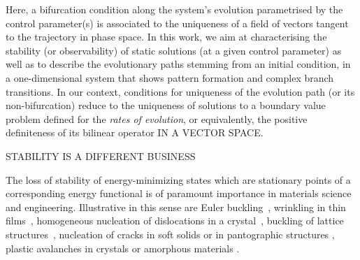 Here, 
a bifurcation condition along the system's evolution parametrised by the control parameter(s) is associated to the uniqueness of a field of vectors tangent to the trajectory in phase space.
In this work, we aim at characterising the stability (or observability) of static solutions (at a given control parameter) as well as to describe the evolutionary paths stemming from an initial condition, in a one-dimensional system that shows pattern formation and complex branch transitions. In our context, conditions for uniqueness of the evolution path (or its non-bifurcation) reduce to the uniqueness of solutions to a boundary value problem defined for the \emph{rates of evolution}, or equivalently, the positive definiteness of its bilinear operator IN A VECTOR SPACE.

STABILITY IS A DIFFERENT BUSINESS

The loss of stability of energy-minimizing states which are stationary points of a corresponding energy functional is of paramount importance in materials science and engineering. Illustrative in this sense are Euler buckling~\cite{Bettiol2020-ey}, wrinkling in thin films~\cite{Hutchinson2013-jk}, homogeneous nucleation of dislocations in a crystal~\cite{Carpio2005-bv,Plans2007-cx,Baggio2019-rs,Mayer2022-km,Baggio2023-qu}, buckling of lattice structures~\cite{Combescure2016-dy,Bertoldi2008-au}, nucleation of cracks in soft solids or in pantographic structures \cite{Riccobelli2023-fc,Salman2021-mn}, plastic  avalanches in crystals or amorphous materials \cite{Zhang2020-ax,Weiss2021-db,Yang2020-zm}.

